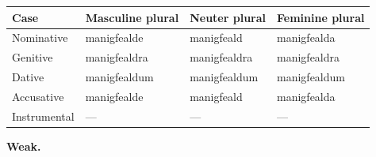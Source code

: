 \par\begingroup
\fontsize{10.5}{13.2}\selectfont
\par\begin{minipage}{\linewidth}\raggedright
\setlength{\LTleft}{0pt}\setlength{\LTright}{\fill}
\noindent
\begin{tabular}{@{}>{\raggedright\arraybackslash}p{22mm}>{\raggedright\arraybackslash}p{31.18mm}>{\raggedright\arraybackslash}p{31.18mm}>{\raggedright\arraybackslash}p{31.18mm}@{}}
\toprule
\textbf{Case} & \textbf{Masculine plural} & \textbf{Neuter plural} & \textbf{Feminine plural} \\
\midrule
Nominative & manigfealde & manigfeald & manigfealda \\
Genitive & manigfealdra & manigfealdra & manigfealdra \\
Dative & manigfealdum & manigfealdum & manigfealdum \\
Accusative & manigfealde & manigfeald & manigfealda \\
Instrumental & — & — & — \\
\bottomrule
\end{tabular}
\end{minipage}\par
\par\endgroup
\par\addvspace{5pt}

\textbf{Weak.}

